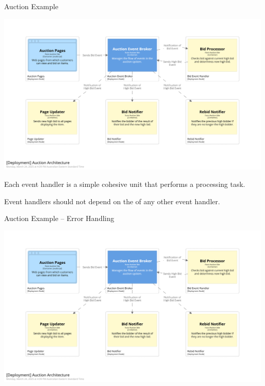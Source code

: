 \documentclass{slide}
\begin{document}
\begin{frame}{Auction Example}
    \begin{adjustwidth}{-10mm}{-10mm}
        \centering
        \includegraphics[trim=195 195 195 195,clip,width=0.97\paperwidth]{../../notes/event/diagrams/auction-architecture.png}
    \end{adjustwidth}
\end{frame}

{Each event handler is a simple cohesive unit that performs a  processing task.}

{Event handlers should not depend on the  of any other event handler.}

\begin{frame}{Auction Example -- Error Handling}
    \begin{adjustwidth}{-10mm}{-10mm}
        \centering
        \includegraphics[trim=195 195 195 195,clip,width=0.97\paperwidth]{../../notes/event/diagrams/auction-architecture.png}
    \end{adjustwidth}
\end{frame}
\end{document}
